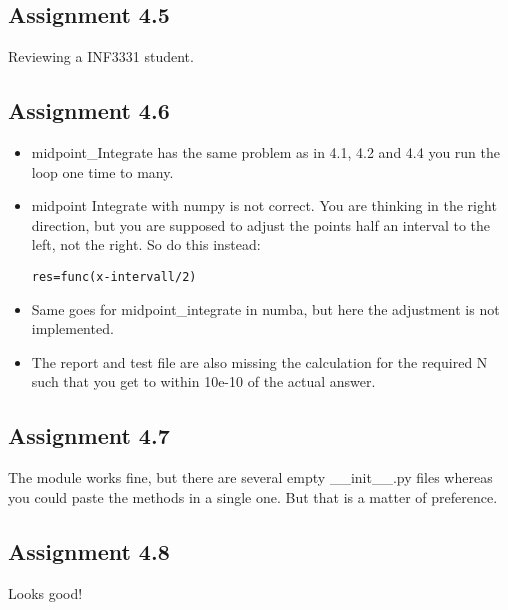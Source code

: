\documentclass[a4paper]{article}
\begin{document}
\subsection*{Assignment 4.5}
Reviewing a INF3331 student.

\subsection*{Assignment 4.6}
\begin{itemize}
 \item midpoint{\_}Integrate has the same problem as in 4.1, 4.2 and 4.4 you run the loop one time to many. 
\item midpoint  Integrate with numpy is not correct. You are thinking in the right direction, but you are supposed to adjust the points half an interval to the left, not the right. So do this instead:

\begin{verbatim}
res=func(x-intervall/2) 
\end{verbatim}

  \item Same goes for midpoint{\_}integrate in numba, but here the adjustment is not implemented.
  \item The report and test file are also missing the calculation for the required N such that you get to within {10e-10} of the actual answer.
  
\end{itemize}


\subsection*{Assignment 4.7}
The module works fine, but there are several empty {\_}{\_}init{\_}{\_}.py files whereas you could paste the methods in a single one. But that is a matter of preference. 

\subsection*{Assignment 4.8}
Looks good!


\end{document}
